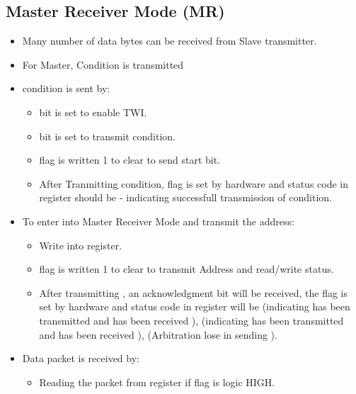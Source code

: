 \subsection{Master Receiver Mode (MR)}
\begin{itemize}
    \item Many number of data bytes can be received from Slave transmitter.
    \item For Master,  Condition is transmitted
    \item {} condition is sent by:
    \begin{itemize}
        \item {} bit is set to enable TWI.
        \item {} bit is set to transmit  condition.
        \item {} flag is written 1 to clear to send start bit.
        \item After Tranmitting  condition,  flag is set by hardware and status code in  register should be  - indicating successfull transmission of  condition.
    \end{itemize}
    \item  To enter into Master Receiver Mode and transmit the address:
    \begin{itemize}
        \item Write  into  register.
        \item {} flag is written 1 to clear to transmit Address and read/write status.
        \item After transmitting , an acknowledgment bit will be received, the  flag is set by hardware and status code in  register will be  (indicating  has been transmitted and  has been received ),  (indicating  has been transmitted and  has been received ),  (Arbitration lose in sending ).
    \end{itemize}
    \item Data packet is received by:
    \begin{itemize}
        \item Reading the  packet from  register if  flag is logic HIGH.

\end{itemize}
\end{itemize}
